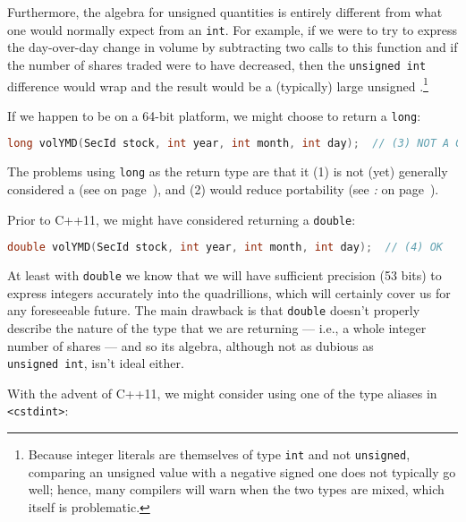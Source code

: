 Furthermore, the algebra for unsigned quantities is entirely different
from what one would normally expect from an \lstinline!int!. For example, if we
were to try to express the day-over-day change in volume by
subtracting two calls to this function and if the number of shares
traded were to have decreased, then the \lstinline!unsigned!~\lstinline!int!
difference would wrap and the result would be a (typically) large
unsigned .{\cprotect\footnote{Because integer
literals are themselves of type \lstinline!int! and not \lstinline!unsigned!,
comparing an unsigned value with a negative signed one does not
typically go well; hence, many compilers will warn when the two types
  are mixed, which itself is problematic.}}

If we happen to be on a 64-bit platform, we might choose to return a
\lstinline!long!:

\begin{lstlisting}[language=C++]
long volYMD(SecId stock, int year, int month, int day);  // (3) NOT A GOOD IDEA
\end{lstlisting}

\noindent The problems using \lstinline!long! as the return type are that it (1) is
not (yet) generally considered a  (see
{\it{}} on page~\pageref{longlong-appendix}), and (2) would reduce portability (see
{\it{}: } on page~\pageref{relying-on-the-relative-sizes-of-int,-long,-and-long-long}).

Prior to C++11, we might have considered returning a \lstinline!double!:

\begin{lstlisting}[language=C++]
double volYMD(SecId stock, int year, int month, int day);  // (4) OK
\end{lstlisting}

\noindent At least with \lstinline!double! we know that we will have sufficient precision (53 bits) to express
integers accurately into the quadrillions, which will certainly cover us
for any foreseeable future. The main drawback is that \lstinline!double!
doesn't properly describe the nature of the type that we are returning
--- i.e., a whole integer number of shares --- and so its algebra,
although not as dubious as \lstinline!unsigned!~\lstinline!int!, isn't ideal
either.

With the advent of C++11, we might consider using one of the type aliases
in \lstinline!<cstdint>!:

